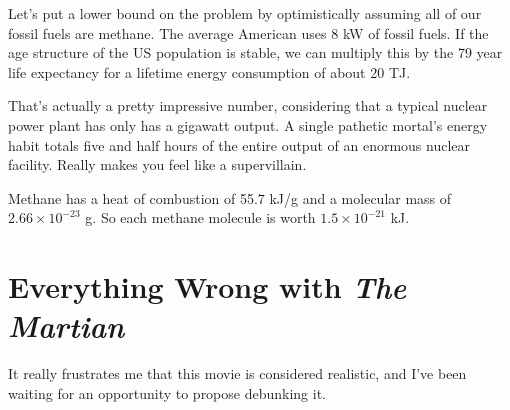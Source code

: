 \documentclass[12pt]{article}
\begin{document}
Let's put a lower bound on the problem by optimistically assuming all of our fossil fuels are methane. The average American uses 8 kW of fossil fuels. If the age structure of the US population is stable, we can multiply this by the 79 year life expectancy for a lifetime energy consumption of about 20 TJ.

That's actually a pretty impressive number, considering that a typical nuclear power plant has only has a gigawatt output. A single pathetic mortal's energy habit totals five and half hours of the entire output of an enormous nuclear facility. Really makes you feel like a supervillain.

Methane has a heat of combustion of 55.7 kJ/g and a molecular mass of \(2.66 \times 10^{-23}\) g. So each methane molecule is worth \(1.5 \times 10^{-21}\) kJ.




\section{Everything Wrong with \textit{The Martian}}

It really frustrates me that this movie is considered realistic, and I've been waiting for an opportunity to propose debunking it.
\end{document}
